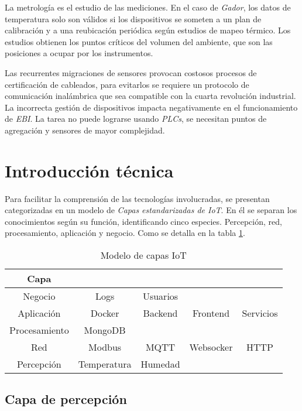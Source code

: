 			La metrología es el estudio de las mediciones. En el caso de \emph{Gador}, los datos de temperatura solo son válidos si los dispositivos se someten a un plan de calibración y a una reubicación periódica según estudios de mapeo térmico. Los estudios obtienen los puntos críticos del volumen del ambiente, que son las posiciones a ocupar por los instrumentos.
			
			Las recurrentes migraciones de sensores provocan costosos procesos de certificación de cableados, para evitarlos se requiere un protocolo de comunicación inalámbrica que sea compatible con la cuarta revolución industrial. La incorrecta gestión de dispositivos impacta negativamente en el funcionamiento de \emph{EBI}. La tarea no puede lograrse usando \emph{PLCs}, se necesitan puntos de agregación y sensores de mayor complejidad.

\section{Introducción técnica}
\label{introTecnica}

	Para facilitar la comprensión de las tecnologías involucradas, se presentan categorizadas en un modelo de \emph{Capas estandarizadas de IoT}. En él se separan los conocimientos según su función, identificando cinco especies. Percepción, red, procesamiento, aplicación y negocio. Como se detalla en la tabla \ref{tab:modeloCapas}.
	
	\begin{table}
		\centering
		\begin{tabular}{c|cccc}
			Capa          &             &           &           &           \\ \hline
			Negocio       & Logs        & Usuarios  &           &           \\
			Aplicación    & Docker      & Backend   & Frontend  & Servicios \\
			Procesamiento & MongoDB     &           &           &           \\
			Red           & Modbus      & MQTT      & Websocker & HTTP      \\
			Percepción    & Temperatura & Humedad 	&           &           \\
		\end{tabular}
		\caption{\label{tab:modeloCapas}Modelo de capas IoT}
	\end{table}
	
	\subsection{Capa de percepción}
	\label{capaPercepcion}
	
